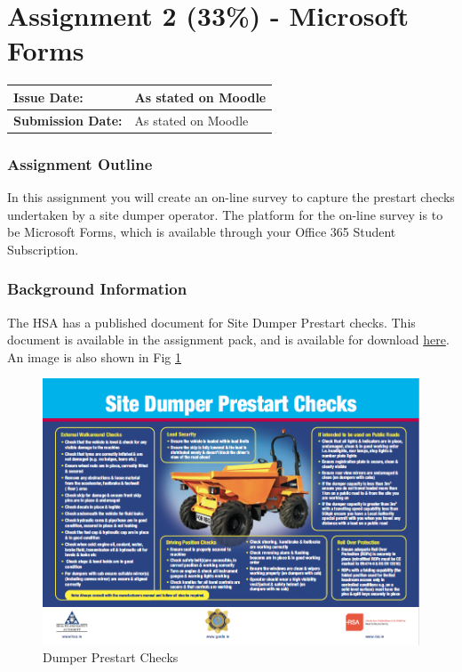 
	
\part*{Assignment 2 (33\%) - Microsoft Forms}

\begin{tabularx}{\textwidth}{ |X|X| }
	\hline
	\textbf{Issue Date:} & As stated on Moodle \\
	\hline 
	\textbf{Submission Date:}  & As stated on Moodle  \\
	\hline
\end{tabularx}


\section*{Assignment Outline}


In this assignment you will create an on-line survey to capture the prestart checks undertaken by a site dumper operator.  The platform for the on-line survey is to be Microsoft Forms, which is available through your Office 365 Student Subscription.


\section*{Background Information}

The HSA has a published document for Site Dumper Prestart checks.  This document is available in the assignment pack, and is available for download \href{https://www.hsa.ie/eng/Publications_and_Forms/Publications/Construction/Site_Dumper_and_360_Excavator_Pre-start_Checks.html}{here}.  An image is also shown in Fig \ref{fig:DumperPrestartChecks}

\begin{figure}
	\centering
	\includegraphics[width=1.0\linewidth]{./img/DumperPrestart.png}
	\caption{Dumper Prestart Checks}
	\label{fig:DumperPrestartChecks}
\end{figure}

